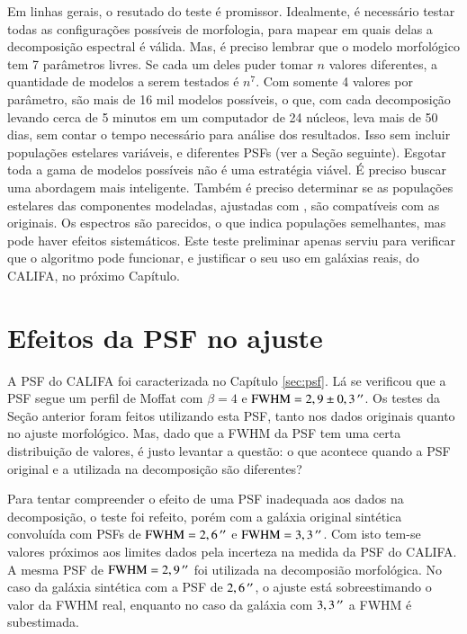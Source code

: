 Em linhas gerais, o resutado do teste é promissor. Idealmente, é necessário
testar todas as configurações possíveis de morfologia, para mapear em quais
delas a decomposição espectral é válida. Mas, é preciso lembrar que o modelo
morfológico tem 7 parâmetros livres. Se cada um deles puder tomar $n$ valores
diferentes, a quantidade de modelos a serem testados é $n^7$. Com somente 4
valores por parâmetro, são mais de 16 mil modelos possíveis, o que, com cada
decomposição levando cerca de 5 minutos em um computador de 24 núcleos, leva
mais de 50 dias, sem contar o tempo necessário para análise dos resultados. Isso
sem incluir populações estelares variáveis, e diferentes PSFs (ver a Seção
seguinte). Esgotar toda a gama de modelos possíveis não é uma estratégia viável.
É preciso buscar uma abordagem mais inteligente. Também é preciso determinar se
as populações estelares das componentes modeladas, ajustadas com \starlight, são
compatíveis com as originais. Os espectros são parecidos, o que indica
populações semelhantes, mas pode haver efeitos sistemáticos. Este teste
preliminar apenas serviu para verificar que o algoritmo pode funcionar, e
justificar o seu uso em galáxias reais, do CALIFA, no próximo Capítulo.

\section{Efeitos da PSF no ajuste}
\label{sec:test:psf}

A PSF do CALIFA foi caracterizada no Capítulo \ref{sec:psf}. Lá se verificou que
a PSF segue um perfil de Moffat com $\beta=4$ e $\mathrm{FWHM} = 2,9 \pm
0,3\,^{\prime\prime}$. Os testes da Seção anterior foram feitos utilizando esta PSF, tanto
nos dados originais quanto no ajuste morfológico. Mas, dado que a FWHM da PSF
tem uma certa distribuição de valores, é justo levantar a questão: o que
acontece quando a PSF original e a utilizada na decomposição são diferentes?

Para tentar compreender o efeito de uma PSF inadequada aos dados na
decomposição, o teste foi refeito, porém com a galáxia original sintética
convoluída com PSFs de $\mathrm{FWHM} = 2,6\,^{\prime\prime}$ e $\mathrm{FWHM} =
3,3\,^{\prime\prime}$. Com isto tem-se valores próximos aos limites dados pela incerteza
na medida da PSF do CALIFA. A mesma PSF de $\mathrm{FWHM} = 2,9\,^{\prime\prime}$ foi
utilizada na decomposião morfológica. No caso da galáxia sintética com a PSF de
$2,6\,^{\prime\prime}$, o ajuste está sobreestimando o valor da FWHM real, enquanto no
caso da galáxia com $3,3\,^{\prime\prime}$ a FWHM é subestimada.

